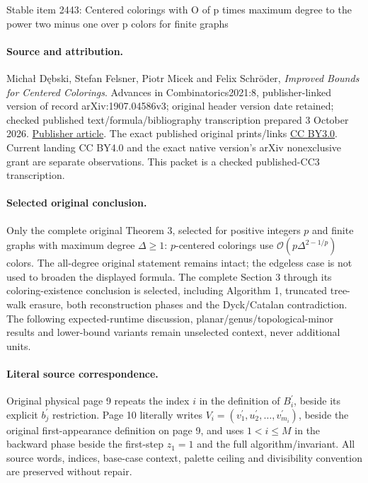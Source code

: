 \documentclass[11pt]{article}
\begin{document}
\begin{center}{\Large Stable item 2443: Centered colorings with O of p times maximum degree to the power two minus one over p colors for finite graphs}\end{center}
\paragraph{Source and attribution.} Michał Dębski, Stefan Felsner, Piotr Micek and Felix Schröder, \emph{Improved Bounds for Centered Colorings}. Advances in Combinatorics2021:8, publisher-linked version of record arXiv:1907.04586v3; original header version date retained; checked published text/formula/bibliography transcription prepared 3 October 2026. \href{https://www.advancesincombinatorics.com/article/27351-improved-bounds-for-centered-colorings}{Publisher article}. The exact published original prints/links \href{https://creativecommons.org/licenses/by/3.0/}{CC BY3.0}. Current landing CC BY4.0 and the exact native version's arXiv nonexclusive grant are separate observations. This packet is a checked published-CC3 transcription.
\paragraph{Selected original conclusion.} Only the complete original Theorem 3, selected for positive integers \(p\) and finite graphs with maximum degree \(\Delta\ge1\): \(p\)-centered colorings use \(\mathcal{O}(p\Delta^{2-1/p})\) colors. The all-degree original statement remains intact; the edgeless case is not used to broaden the displayed formula. The complete Section 3 through its coloring-existence conclusion is selected, including Algorithm 1, truncated tree-walk erasure, both reconstruction phases and the Dyck/Catalan contradiction. The following expected-runtime discussion, planar/genus/topological-minor results and lower-bound variants remain unselected context, never additional units.
\paragraph{Literal source correspondence.} Original physical page 9 repeats the index \(i\) in the definition of \(B_i^{\prime}\), beside its explicit \(b_j^{\prime}\) restriction. Page 10 literally writes \(V_i=(v_1^{\prime},u_2^{\prime},\ldots,v_{m_i}^{\prime})\), beside the original first-appearance definition on page 9, and uses \(1<i\le M\) in the backward phase beside the first-step \(z_1=1\) and the full algorithm/invariant. All source words, indices, base-case context, palette ceiling and divisibility convention are preserved without repair.
\end{document}
